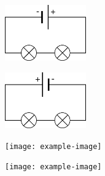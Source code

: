 \documentclass[10pt]{article}
\begin{document}
	\begin{center}
		\begin{minipage}[c]{0.45\textwidth}
			\centering
			\includegraphics[width=3.5cm]{lamp_lamp_inverted.png}
		\end{minipage}
		\hspace{0pt}
		\begin{minipage}[c]{0.45\textwidth}
			\centering
			\includegraphics[width=3.5cm]{lamp_lamp.png}
		\end{minipage}
	\end{center}







\begin{question}
	\end{question}


	\begin{minipage}[c]{0.55\textwidth}

			
	\end{minipage}
	\hspace{10pt}
	\begin{minipage}[c]{0.45\textwidth}
		\begin{minipage}[t]{0.45\textwidth}
			\texttt{[image: example-image]}
		\end{minipage}
		\hspace{ 20pt}
		\begin{minipage}[t]{0.45\textwidth}
			\texttt{[image: example-image]}
		\end{minipage}	
	\end{minipage}
\end{document}
